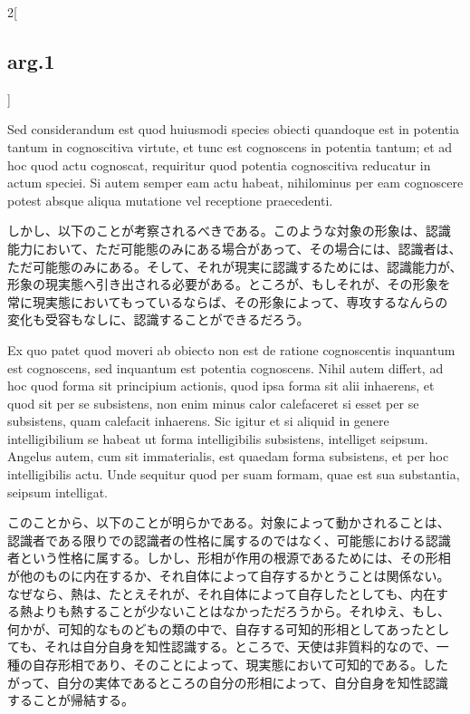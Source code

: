 \documentclass[paper=a4paper,fontsize=10pt,jafontsize=9pt,titlepage]{jlreq}
\begin{document}
\begin{paracol}{2}[\subsection{arg.1}]
\switchcolumn*

Sed considerandum est quod huiusmodi species obiecti quandoque est in
potentia tantum in cognoscitiva virtute, et tunc est cognoscens in
potentia tantum; et ad hoc quod actu cognoscat, requiritur quod
potentia cognoscitiva reducatur in actum speciei. Si autem semper eam
actu habeat, nihilominus per eam cognoscere potest absque aliqua
mutatione vel receptione praecedenti.

\switchcolumn

しかし、以下のことが考察されるべきである。このような対象の形象は、認識
能力において、ただ可能態のみにある場合があって、その場合には、認識者は、
ただ可能態のみにある。そして、それが現実に認識するためには、認識能力が、
形象の現実態へ引き出される必要がある。ところが、もしそれが、その形象を
常に現実態においてもっているならば、その形象によって、専攻するなんらの
変化も受容もなしに、認識することができるだろう。

\switchcolumn*

Ex quo patet quod moveri ab obiecto non est de ratione cognoscentis
inquantum est cognoscens, sed inquantum est potentia cognoscens. Nihil
autem differt, ad hoc quod forma sit principium actionis, quod ipsa
forma sit alii inhaerens, et quod sit per se subsistens, non enim
minus calor calefaceret si esset per se subsistens, quam calefacit
inhaerens. Sic igitur et si aliquid in genere intelligibilium se
habeat ut forma intelligibilis subsistens, intelliget seipsum. Angelus
autem, cum sit immaterialis, est quaedam forma subsistens, et per hoc
intelligibilis actu. Unde sequitur quod per suam formam, quae est sua
substantia, seipsum intelligat.

\switchcolumn

このことから、以下のことが明らかである。対象によって動かされることは、
認識者である限りでの認識者の性格に属するのではなく、可能態における認識
者という性格に属する。しかし、形相が作用の根源であるためには、その形相
が他のものに内在するか、それ自体によって自存するかとうことは関係ない。
なぜなら、熱は、たとえそれが、それ自体によって自存したとしても、内在す
る熱よりも熱することが少ないことはなかっただろうから。それゆえ、もし、
何かが、可知的なものどもの類の中で、自存する可知的形相としてあったとし
ても、それは自分自身を知性認識する。ところで、天使は非質料的なので、一
種の自存形相であり、そのことによって、現実態において可知的である。した
がって、自分の実体であるところの自分の形相によって、自分自身を知性認識
することが帰結する。

\switchcolumn*[\subsection{ad.1}]


\end{paracol}
\end{document}
